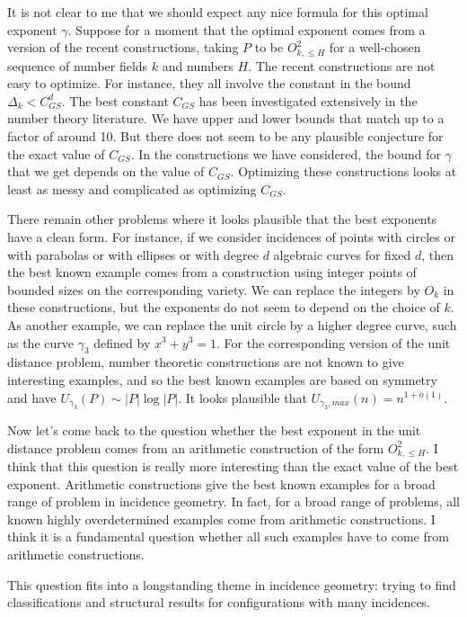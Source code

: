 \documentclass{amsart}
\begin{document}
It is not clear to me that we should expect any nice formula for this optimal exponent $\gamma$.  Suppose for a moment that the optimal exponent comes from a version of the recent constructions, taking $P$ to be $O_{k, \le H}^2$ for a well-chosen sequence of number fields $k$ and numbers $H$.  The recent constructions are not easy to optimize.  For instance, they all involve the constant in the bound $\Delta_k < C_{GS}^d$.  The best constant $C_{GS}$ has been investigated extensively in the number theory literature.  We have upper and lower bounds that match up to a factor of around 10.  But there does not seem to be any plausible conjecture for the exact value of $C_{GS}$.  In the constructions we have considered, the bound for $\gamma$ that we get depends on the value of $C_{GS}$.  Optimizing these constructions looks at least as messy and complicated as optimizing $C_{GS}$.

There remain other problems where it looks plausible that the best exponents have a clean form.  For instance, if we consider incidences of points with circles or with parabolas or with ellipses or with degree $d$ algebraic curves for fixed $d$, then the best known example comes from a construction using integer points of bounded sizes on the corresponding variety.  We can replace the integers by $O_k$ in these constructions, but the exponents do not seem to depend on the choice of $k$.  As another example, we can replace the unit circle by a higher degree curve, such as the curve $\gamma_3$ defined by $x^3 + y^3 = 1$.  For the corresponding version of the unit distance problem, number theoretic constructions are not known to give interesting examples, and so the best known examples are based on symmetry and have $U_{\gamma_3}(P) \sim |P|  \log |P|$.  It looks plausible that $U_{\gamma_3, max}(n) = n^{1 + o(1)}$.  

Now let's come back to the question whether the best exponent in the unit distance problem comes from an arithmetic construction of the form $O_{k, \le H}^2$.  I think that this question is really more interesting than the exact value of the best exponent.  Arithmetic constructions give the best known examples for a broad range of problem in incidence geometry.  In fact, for a broad range of problems, all known highly overdetermined examples come from arithmetic constructions.  I think it is a fundamental question whether all such examples have to come from arithmetic constructions.  

This question fits into a longstanding theme in incidence geometry: trying to find classifications and structural results for configurations with many incidences.  
\end{document}
